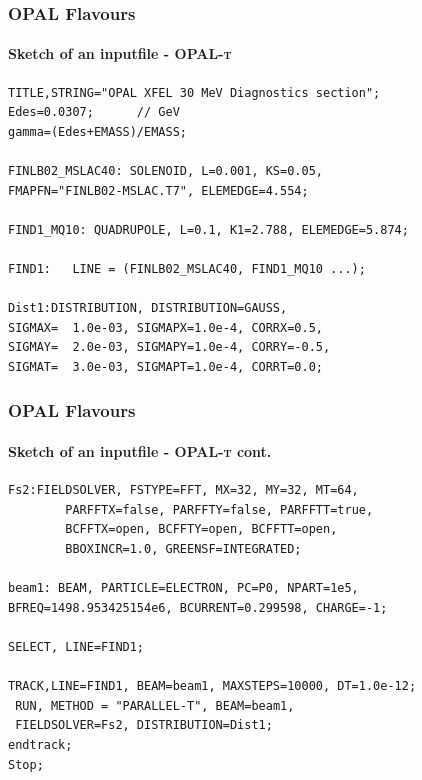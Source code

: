 \documentclass[xcolor=pdftex,table,10pt,yellow,mathserif]{beamer}
\newcommand{\opal}{\textsc{OPAL }}
\newcommand{\opalt}{\textsc{OPAL-t }}
\begin{document}
\begin{frame}[fragile]
\frametitle{\opal Flavours} 
\framesubtitle{Sketch of an inputfile - \opalt}
\begin{block}{}
\begin{verbatim}
TITLE,STRING="OPAL XFEL 30 MeV Diagnostics section";
Edes=0.0307;      // GeV
gamma=(Edes+EMASS)/EMASS;

FINLB02_MSLAC40: SOLENOID, L=0.001, KS=0.05, 
FMAPFN="FINLB02-MSLAC.T7", ELEMEDGE=4.554;

FIND1_MQ10: QUADRUPOLE, L=0.1, K1=2.788, ELEMEDGE=5.874;

FIND1:   LINE = (FINLB02_MSLAC40, FIND1_MQ10 ...);

Dist1:DISTRIBUTION, DISTRIBUTION=GAUSS,
SIGMAX=  1.0e-03, SIGMAPX=1.0e-4, CORRX=0.5,
SIGMAY=  2.0e-03, SIGMAPY=1.0e-4, CORRY=-0.5,
SIGMAT=  3.0e-03, SIGMAPT=1.0e-4, CORRT=0.0;
\end{verbatim}
\end{block}
\end{frame}


\begin{frame}[fragile]
\frametitle{\opal Flavours} 
\framesubtitle{Sketch of an inputfile - \opalt cont.}
\begin{block}{}
\begin{verbatim}
Fs2:FIELDSOLVER, FSTYPE=FFT, MX=32, MY=32, MT=64, 
        PARFFTX=false, PARFFTY=false, PARFFTT=true,
        BCFFTX=open, BCFFTY=open, BCFFTT=open,
        BBOXINCR=1.0, GREENSF=INTEGRATED;

beam1: BEAM, PARTICLE=ELECTRON, PC=P0, NPART=1e5, 
BFREQ=1498.953425154e6, BCURRENT=0.299598, CHARGE=-1;

SELECT, LINE=FIND1;

TRACK,LINE=FIND1, BEAM=beam1, MAXSTEPS=10000, DT=1.0e-12;
 RUN, METHOD = "PARALLEL-T", BEAM=beam1, 
 FIELDSOLVER=Fs2, DISTRIBUTION=Dist1;
endtrack;
Stop;
\end{verbatim}
\end{block}
\end{frame}
\end{document}
